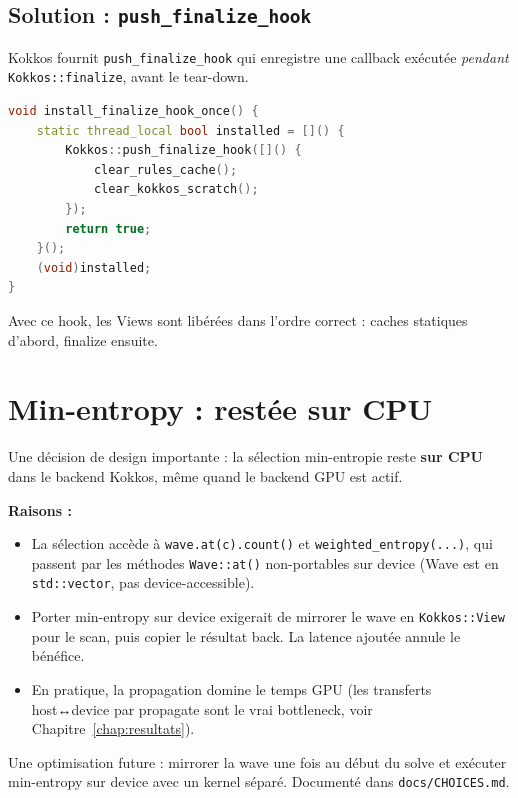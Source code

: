 \subsection{Solution : \texttt{push\_finalize\_hook}}

Kokkos fournit \texttt{push\_finalize\_hook} qui enregistre une callback exécutée \textit{pendant} \texttt{Kokkos::finalize}, avant le tear-down.

\begin{lstlisting}[language=C++]
void install_finalize_hook_once() {
    static thread_local bool installed = []() {
        Kokkos::push_finalize_hook([]() {
            clear_rules_cache();
            clear_kokkos_scratch();
        });
        return true;
    }();
    (void)installed;
}
\end{lstlisting}

Avec ce hook, les Views sont libérées dans l'ordre correct : caches statiques d'abord, finalize ensuite.

\section{Min-entropy : restée sur CPU}
\label{sec:kokkos:min_entropy_cpu}

Une décision de design importante : la sélection min-entropie reste \textbf{sur CPU} dans le backend Kokkos, même quand le backend GPU est actif.

\textbf{Raisons :}
\begin{itemize}
    \item La sélection accède à \texttt{wave.at(c).count()} et \texttt{weighted\_entropy(...)}, qui passent par les méthodes \texttt{Wave::at()} non-portables sur device (Wave est en \texttt{std::vector}, pas device-accessible).
    \item Porter min-entropy sur device exigerait de mirrorer le wave en \texttt{Kokkos::View} pour le scan, puis copier le résultat back. La latence ajoutée annule le bénéfice.
    \item En pratique, la propagation domine le temps GPU (les transferts host↔device par propagate sont le vrai bottleneck, voir Chapitre~\ref{chap:resultats}).
\end{itemize}

Une optimisation future : mirrorer la wave une fois au début du solve et exécuter min-entropy sur device avec un kernel séparé. Documenté dans \texttt{docs/CHOICES.md}.

